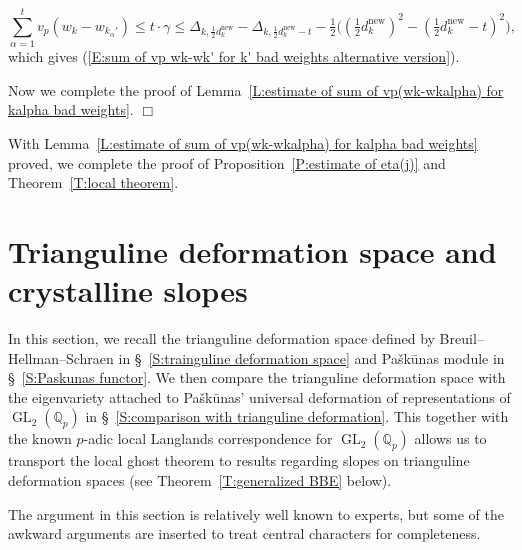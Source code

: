 \documentclass[12pt]{amsart}
\theoremstyle{definition}
\numberwithin{equation}{subsection}
\def\FF{\mathbb{F}}
\def\QQ{\mathbb{Q}}
\def\rmI{\mathrm{I}}
\DeclareMathOperator{\Gal}{Gal}
\DeclareMathOperator{\GL}{GL}
\newcommand{\new}{\mathrm{new}}
\begin{document}
		\[
		\sum_{\alpha=1}^t v_p(w_k-w_{k_\alpha'})\leq t\cdot\gamma\leq \Delta_{k,\frac 12 d_k^\new}-\Delta_{k,\frac 12 d_k^\new-t}-\tfrac 12\big((\tfrac 12d_k^\new)^2-(\tfrac 12d_k^\new-t)^2 \big),
		\]
		which gives (\ref{E:sum of vp wk-wk' for k' bad weights alternative version}).

		Now we complete the proof of Lemma~\ref{L:estimate of sum of vp(wk-wkalpha) for kalpha bad weights}. \hfill $\Box$

\smallskip
With Lemma~\ref{L:estimate of sum of vp(wk-wkalpha) for kalpha bad weights} proved, we complete the proof of Proposition~\ref{P:estimate of eta(j)} and Theorem~\ref{T:local theorem}.









\section{Trianguline deformation space and crystalline slopes}
\label{Sec:Galois eigenvarieties}



In this section, we recall the trianguline deformation space defined by Breuil--Hellman--Schraen \cite{breuil-hellmann-schraen} in \S~\ref{S:trainguline deformation space} and Pa\v sk\= unas module in \S~\ref{S:Paskunas functor}.  We then compare the trianguline deformation space with the eigenvariety attached to Pa\v sk\= unas' universal deformation of representations of $\GL_2(\QQ_p)$ \cite{paskunas-functor} in \S~\ref{S:comparison with trianguline deformation}. This together with the known $p$-adic local Langlands correspondence for $\GL_2(\QQ_p)$ allows us to transport the local ghost theorem to results regarding slopes on trianguline deformation spaces (see Theorem~\ref{T:generalized BBE} below).

The argument in this section is relatively well known to experts, but some of the awkward arguments are inserted to treat central characters for completeness.

\end{document}
